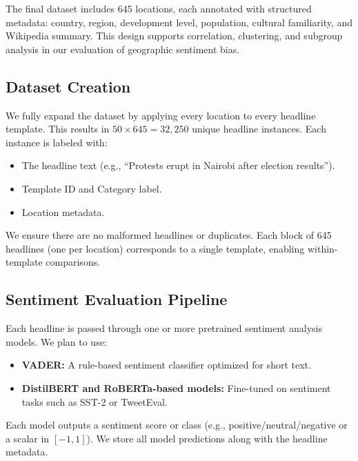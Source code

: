 \documentclass{article} %
\begin{document}
The final dataset includes 645 locations, each annotated with structured metadata: country, region, development level, population, cultural familiarity, and Wikipedia summary. This design supports correlation, clustering, and subgroup analysis in our evaluation of geographic sentiment bias.

\subsection{Dataset Creation}
We fully expand the dataset by applying every location to every headline template. This results in $50 \times 645 = 32{,}250$ unique headline instances. Each instance is labeled with:
\begin{itemize}
  \item The headline text (e.g., “Protests erupt in Nairobi after election results”).  
  \item Template ID and Category label.  
  \item Location metadata.  
\end{itemize}
We ensure there are no malformed headlines or duplicates. Each block of 645 headlines (one per location) corresponds to a single template, enabling within-template comparisons.

\subsection{Sentiment Evaluation Pipeline}
Each headline is passed through one or more pretrained sentiment analysis models. We plan to use:
\begin{itemize}
  \item \textbf{VADER:} A rule-based sentiment classifier optimized for short text.  
  \item \textbf{DistilBERT and RoBERTa-based models:} Fine-tuned on sentiment tasks such as SST-2 or TweetEval.  
\end{itemize}
Each model outputs a sentiment score or class (e.g., positive/neutral/negative or a scalar in $[-1, 1]$). We store all model predictions along with the headline metadata.
\end{document}
